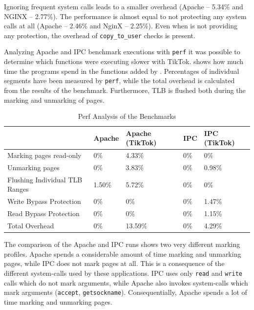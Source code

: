 Ignoring frequent system calls leads to a smaller overhead (Apache -- 5.34\% and
NGINX -- 2.77\%). The performance is almost equal to not protecting any system
calls at all (Apache -- 2.46\% and NginX -- 2.25\%). Even when \sysname
is not providing any protection, the overhead of \texttt{copy\_to\_user} checks
is present.


Analyzing Apache and IPC benchmark executions with \texttt{perf} it was possible
to determine which functions were executing slower with TikTok.
 shows how much time the programs spend in the functions added
by \sysname. Percentages of individual segments have been measured by
\texttt{perf}, while the total overhead is calculated from the results of the
benchmark. Furthermore, TLB is flushed both during the marking and unmarking of
pages.

\begin{table}[]
  \label{table:perf}
  \centering
  \begin{tabular}{|l|l|l|l|l|}
  \hline
                                 & Apache & Apache (TikTok) & IPC & IPC (TikTok)\\ \hline
  Marking pages read-only        & 0\%    & 4.33\%          & 0\% & 0\%         \\ \hline
  Unmarking pages                & 0\%    & 3.83\%          & 0\% & 0.98\%      \\ \hline
  Flushing Individual TLB Ranges & 1.50\% & 5.72\%          & 0\% & 0\%         \\ \hline
  Write Bypass Protection        & 0\%    & 0\%             & 0\% & 1.47\%      \\ \hline
  Read Bypass Protection         & 0\%    & 0\%             & 0\% & 1.15\%      \\ \hline
  Total Overhead                 & 0\%    & 13.59\%         & 0\% & 4.29\%      \\ \hline
  \end{tabular}
  \caption{Perf Analysis of the Benchmarks}
\end{table}

The comparison of the Apache and IPC runs shows two very different marking
profiles. Apache spends a considerable amount of time marking and unmarking
pages, while IPC does not mark pages at all. This is a consequence of the
different system-calls used by these applications. IPC uses only \texttt{read}
and \texttt{write} calls which do not mark arguments, while Apache also invokes
system-calls which mark arguments (\texttt{accept}, \texttt{getsockname}).
Consequentially, Apache spends a lot of time marking and unmarking pages.

